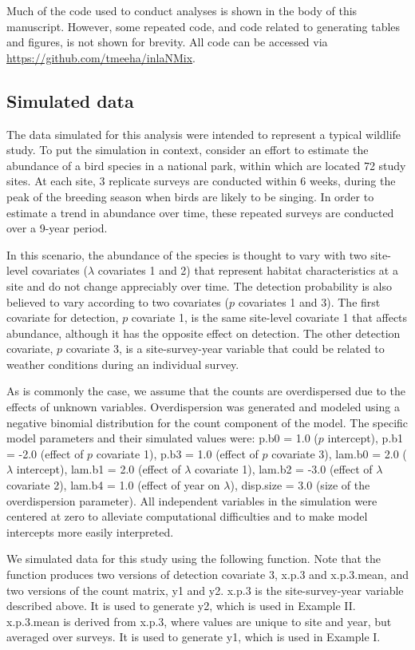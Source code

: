 \documentclass[article]{jss}
\begin{document}
Much of the code used to conduct analyses is shown in the body of this manuscript. However, some repeated code, and code related to generating tables and figures, is not shown for brevity.  All code can be accessed via \url{https://github.com/tmeeha/inlaNMix}.

\subsection[Simulated data]{Simulated data}
The data simulated for this analysis were intended to represent a typical wildlife study. To put the simulation in context, consider an effort to estimate the abundance of a bird species in a national park, within which are located 72 study sites. At each site, 3 replicate surveys are conducted within 6 weeks, during the peak of the breeding season when birds are likely to be singing. In order to estimate a trend in abundance over time, these repeated surveys are conducted over a 9-year period.

In this scenario, the abundance of the species is thought to vary with two site-level covariates ($\lambda$ covariates 1 and 2) that represent habitat characteristics at a site and do not change appreciably over time. The detection probability is also believed to vary according to two covariates ($p$ covariates 1 and 3). The first covariate for detection, $p$ covariate 1, is the same site-level covariate 1 that affects abundance, although it has the opposite effect on detection. The other detection covariate, $p$ covariate 3, is a site-survey-year variable that could be related to weather conditions during an individual survey.

As is commonly the case, we assume that the counts are overdispersed due to the effects of unknown variables. Overdispersion was generated and modeled using a negative binomial distribution for the count component of the model. The specific model parameters and their simulated values were: p.b0 = 1.0 ($p$ intercept), p.b1 = -2.0 (effect of $p$ covariate 1), p.b3 = 1.0 (effect of $p$ covariate 3), lam.b0 = 2.0 ($\lambda$ intercept), lam.b1 = 2.0 (effect of $\lambda$ covariate 1), lam.b2 = -3.0 (effect of $\lambda$ covariate 2), lam.b4 = 1.0 (effect of year on $\lambda$), disp.size = 3.0 (size of the overdispersion parameter). All independent variables in the simulation were centered at zero to alleviate computational difficulties and to make model intercepts more easily interpreted.

We simulated data for this study using the following function.  Note that the function produces two versions of detection covariate 3, x.p.3 and x.p.3.mean, and two versions of the count matrix, y1 and y2.  x.p.3 is the site-survey-year variable described above.  It is used to generate y2, which is used in Example II.  x.p.3.mean is derived from x.p.3, where values are unique to site and year, but averaged over surveys.  It is used to generate y1, which is used in Example I.
\end{document}
